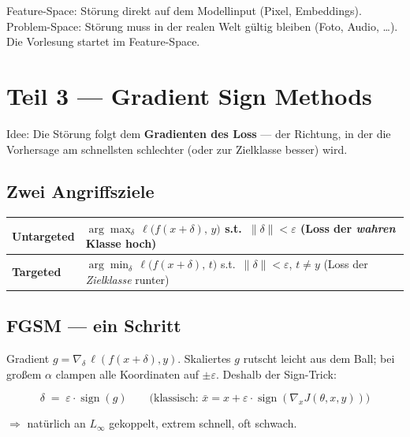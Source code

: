 \documentclass[11pt,a4paper]{article}
\newcommand{\eps}{\varepsilon}
\begin{document}
\begin{warnbox}
Feature-Space: Störung direkt auf dem Modellinput (Pixel, Embeddings).\\
Problem-Space: Störung muss in der realen Welt gültig bleiben
(Foto, Audio, \ldots). Die Vorlesung startet im Feature-Space.
\end{warnbox}

\section{Teil 3 --- Gradient Sign Methods}

Idee: Die Störung folgt dem \textbf{Gradienten des Loss} --- der Richtung,
in der die Vorhersage am schnellsten schlechter (oder zur Zielklasse besser) wird.

\subsection{Zwei Angriffsziele}
\begin{center}
\renewcommand{\arraystretch}{1.3}
\begin{tabularx}{\textwidth}{@{}>{\bfseries}p{2.4cm} X@{}}
\toprule
Untargeted &
$\displaystyle\arg\max_\delta\,\ell\big(f(x+\delta),\,y\big)$
\quad s.t.\ $\|\delta\|<\eps$
\hfill (Loss der \emph{wahren} Klasse hoch) \\
\midrule
Targeted &
$\displaystyle\arg\min_\delta\,\ell\big(f(x+\delta),\,t\big)$
\quad s.t.\ $\|\delta\|<\eps$, $t\neq y$
\hfill (Loss der \emph{Zielklasse} runter) \\
\bottomrule
\end{tabularx}
\end{center}

\subsection{FGSM --- ein Schritt}
Gradient $g=\nabla_\delta\,\ell(f(x+\delta),y)$.
Skaliertes $g$ rutscht leicht aus dem Ball; bei großem $\alpha$ clampen alle
Koordinaten auf $\pm\eps$. Deshalb der Sign-Trick:

\begin{formulabox}
\[
\boxed{\delta \;=\; \eps\cdot\operatorname{sign}(g)}
\qquad\text{(klassisch: }
\bar x = x + \eps\cdot\operatorname{sign}(\nabla_x J(\theta,x,y))
\text{)}
\]
\end{formulabox}
$\Rightarrow$ natürlich an $L_\infty$ gekoppelt, extrem schnell, oft schwach.
\end{document}
